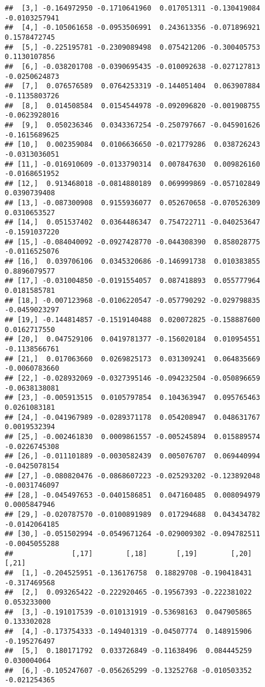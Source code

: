 \documentclass[
]{book}
\begin{document}
\begin{verbatim}
##  [3,] -0.164972950 -0.1710641960  0.017051311 -0.130419084 -0.0103257941
##  [4,] -0.105061658 -0.0953506991  0.243613356 -0.071896921  0.1578472745
##  [5,] -0.225195781 -0.2309089498  0.075421206 -0.300405753  0.1130107856
##  [6,] -0.038201708 -0.0390695435 -0.010092638 -0.027127813 -0.0250624873
##  [7,]  0.076576589  0.0764253319 -0.144051404  0.063907884 -0.1135803726
##  [8,]  0.014508584  0.0154544978 -0.092096820 -0.001908755 -0.0623928016
##  [9,]  0.050236346  0.0343367254 -0.250797667 -0.045901626 -0.1615689625
## [10,]  0.002359084  0.0106636650 -0.021779286  0.038726243 -0.0313036051
## [11,] -0.016910609 -0.0133790314  0.007847630  0.009826160 -0.0168651952
## [12,]  0.913468018 -0.0814880189  0.069999869 -0.057102849  0.0390739408
## [13,] -0.087300908  0.9155936077  0.052670658 -0.070526309  0.0310653527
## [14,]  0.051537402  0.0364486347  0.754722711 -0.040253647 -0.1591037220
## [15,] -0.084040092 -0.0927428770 -0.044308390  0.858028775 -0.0116525076
## [16,]  0.039706106  0.0345320686 -0.146991738  0.010383855  0.8896079577
## [17,] -0.031004850 -0.0191554057  0.087418893  0.055777964  0.0181585781
## [18,] -0.007123968 -0.0106220547 -0.057790292 -0.029798835 -0.0459023297
## [19,] -0.144814857 -0.1519140488  0.020072825 -0.158887600  0.0162717550
## [20,]  0.047529106  0.0419781377 -0.156020184  0.010954551 -0.1138566761
## [21,]  0.017063660  0.0269825173  0.031309241  0.064835669 -0.0060783660
## [22,] -0.028932069 -0.0327395146 -0.094232504 -0.050896659 -0.0638138081
## [23,] -0.005913515  0.0105797854  0.104363947  0.095765463  0.0261083181
## [24,] -0.041967989 -0.0289371178  0.054208947  0.048631767  0.0019532394
## [25,] -0.002461830  0.0009861557 -0.005245894  0.015889574 -0.0226745308
## [26,] -0.011101889 -0.0030582439  0.005076707  0.069440994 -0.0425078154
## [27,] -0.080820476 -0.0868607223 -0.025293202 -0.123892048 -0.0031746097
## [28,] -0.045497653 -0.0401586851  0.047160485  0.008094979  0.0005847946
## [29,] -0.020787570 -0.0100891989  0.017294688  0.043434782 -0.0142064185
## [30,] -0.051502994 -0.0549671264 -0.029009302 -0.094782511 -0.0045055288
##              [,17]        [,18]       [,19]        [,20]        [,21]
##  [1,] -0.204525951 -0.136176758  0.18829708 -0.190418431 -0.317469568
##  [2,]  0.093265422 -0.222920465 -0.19567393 -0.222381022  0.053233000
##  [3,] -0.191017539 -0.010131919 -0.53698163  0.047905865  0.133302028
##  [4,] -0.173754333 -0.149401319 -0.04507774  0.148915906 -0.195276497
##  [5,]  0.180171792  0.033726849 -0.11638496  0.084445259  0.030004064
##  [6,] -0.105247607 -0.056265299 -0.13252768 -0.010503352 -0.021254365

\end{verbatim}
\end{document}
